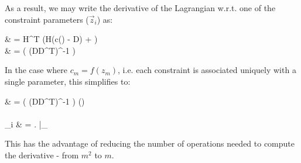 \documentclass[]{article}
\def\ai{\vec{a}_{t_i}}
\def\vi{\vec{v}_i}
\def\wi{\vec{w}}
\begin{document}
			As a result, we may write the derivative of the Lagrangian w.r.t. one of the constraint parameters ($\vec{z}_i$) as:
			\begin{spalign}
				 & = H^T \left(H(c() - D\vec{\alpha}) + \vec{\ell} \right) \cdot  {}
				\\
				& = \left( (DD^T)^{-1}  \right) \cdot {}
			\end{spalign}
			In the case where $c_m = f(z_m)$, i.e. each constraint is associated uniquely with a single parameter, this simplifies to:
			\begin{spalign}
				 & = \left( (DD^T)^{-1}  \right) \otimes \vec{\Delta}(\vec{z})
				\\
				~
				\\
				[\vec{\Delta}(\vec{z})]_i & = \left. \right|_{\vec{z}}
			\end{spalign}
			This has the advantage of reducing the number of operations needed to compute the derivative - from $m^2$ to $m$. 
			
\end{document}

